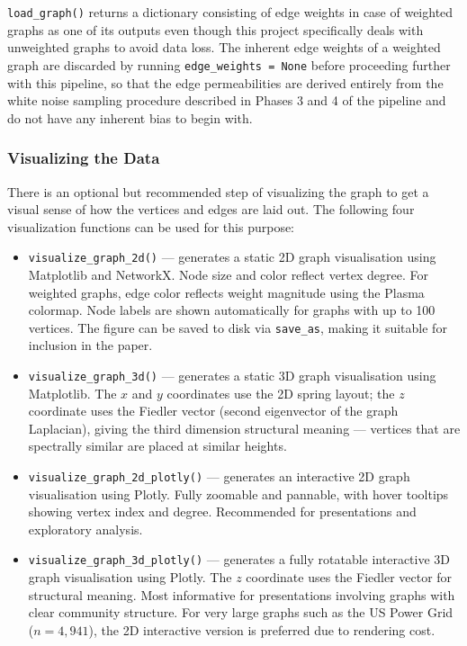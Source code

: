 \documentclass[a4paper,12pt]{amsart}
\numberwithin{equation}{section}
\begin{document}
\texttt{load\_graph()} returns a dictionary consisting of edge weights 
in case of weighted graphs as one of its outputs even though this project specifically deals with unweighted graphs to avoid data loss. The inherent edge weights of a weighted graph are discarded by running 
\texttt{edge\_weights = None} before proceeding further with this 
pipeline, so that the edge permeabilities are derived entirely from the 
white noise sampling procedure described in Phases 3 and 4 of the pipeline and do not have any inherent bias to begin with.

\subsubsection{Visualizing the Data}

There is an optional but recommended step of visualizing the graph to 
get a visual sense of how the vertices and edges are laid out. The 
following four visualization functions can be used for this purpose:

\begin{itemize}

\item \texttt{visualize\_graph\_2d()} — generates a static 2D graph 
visualisation using Matplotlib and NetworkX. Node size and color reflect 
vertex degree. For weighted graphs, edge color reflects weight magnitude 
using the Plasma colormap. Node labels are shown automatically for graphs 
with up to 100 vertices. The figure can be saved to disk via 
\texttt{save\_as}, making it suitable for inclusion in the paper.

\item \texttt{visualize\_graph\_3d()} — generates a static 3D graph 
visualisation using Matplotlib. The $x$ and $y$ coordinates use the 2D spring 
layout; the $z$ coordinate uses the Fiedler vector (second eigenvector of 
the graph Laplacian), giving the third dimension structural meaning — 
vertices that are spectrally similar are placed at similar heights.

\item \texttt{visualize\_graph\_2d\_plotly()} — generates an interactive 
2D graph visualisation using Plotly. Fully zoomable and pannable, with 
hover tooltips showing vertex index and degree. Recommended for 
presentations and exploratory analysis.

\item \texttt{visualize\_graph\_3d\_plotly()} — generates a fully 
rotatable interactive 3D graph visualisation using Plotly. The $z$ 
coordinate uses the Fiedler vector for structural meaning. Most 
informative for presentations involving graphs with clear community 
structure. For very large graphs such as the US Power Grid 
($n = 4{,}941$), the 2D interactive version is preferred due to 
rendering cost.

\end{itemize}
\end{document}
